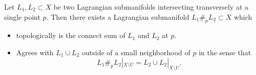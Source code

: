 
Let $L_1, L_2\subset X$ be two Lagrangian submanifolds intersecting transversely at a single point $p$. 
Then there exists a Lagrangian submanifold $L_1\#_p L_2\subset X$ which
\begin{itemize}
        \item topologically is the connect sum of $L_1$ and $L_2$ at $p$. 
        \item Agrees with $L_1\cup L_2$ outside of a small neighborhood of $p$ in the sense that 
        \[L_1\#_p L_2|_{X\setminus U}=L_2\cup L_2|_{X\setminus U}.\]
\end{itemize}
 